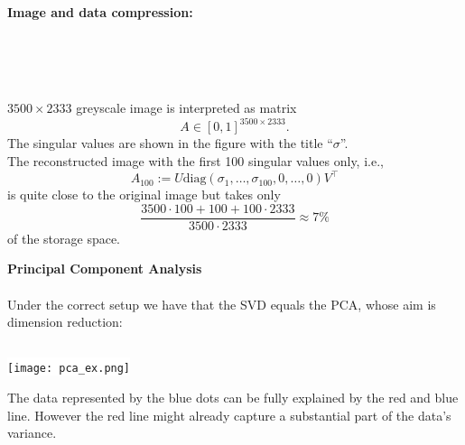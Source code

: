 \begin{frame}
\textbf{ Image and data compression:}\\	~\\~\\
 \begin{minipage}[c]{0.6\textwidth}
 	
 \end{minipage}
 \begin{minipage}[c]{0.03\textwidth}
 	\
 \end{minipage}
 \begin{minipage}[c]{0.35\textwidth}
 	$3500\times2333$ greyscale image is interpreted as matrix $$A\in[0,1]^{3500\times2333}.$$ 
 	The singular values are shown in the figure with the title ``$\sigma$''.\\ 
 	The reconstructed image with the first 100 singular values only, i.e.,
 	$$A_{100}:=U\text{diag}(\sigma_1,\ldots,\sigma_{100},0,\ldots ,0)V^\top$$ 
 	is quite close to the original image but takes only
 	\[
 	\frac{3500\cdot 100+100+100\cdot 2333}{3500\cdot 2333}\approx 7\%
 	\]
 	of the storage space.
 \end{minipage}
\end{frame}


\begin{frame}
\textbf{Principal Component Analysis}\\
~\\
 Under the correct setup we have that the SVD equals the PCA, whose aim is dimension reduction:\\~\\
\begin{center}
	\colorbox{white}{\texttt{[image: pca\_ex.png]}} 
\end{center} 
The data represented by the blue dots can be fully explained by the red and blue line. However the red line might already capture a substantial part of the data's variance.
\end{frame}



